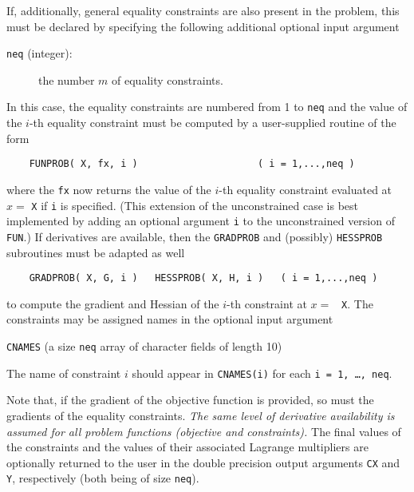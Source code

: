 \documentclass{article}
\begin{document}
If, additionally, general equality constraints are also present in the
problem, this must be declared by specifying the following
additional optional input argument
\begin{description}
\item[{\tt neq} (integer):] the number $m$ of equality constraints.
\end{description}
In this case, the equality constraints are numbered from 1 to {\tt neq}
and the value of the $i$-th equality constraint must be computed by a
user-supplied routine of the form
\begin{lstlisting}
    FUNPROB( X, fx, i )                     ( i = 1,...,neq )
\end{lstlisting}
\noindent
where the {\tt fx} now returns the value of the $i$-th equality constraint
evaluated at $x =$ {\tt X} if {\tt i} is specified. (This extension of the
unconstrained case is best implemented by adding an optional argument
{\tt i} to the unconstrained version of {\tt FUN}.) If derivatives are
available, then the {\tt GRADPROB} and (possibly) {\tt  HESSPROB} subroutines
must be adapted as well
\begin{lstlisting}
    GRADPROB( X, G, i )   HESSPROB( X, H, i )   ( i = 1,...,neq )
\end{lstlisting}
\noindent
to compute the gradient and Hessian of the $i$-th constraint at $x=$ {\tt
X}. The constraints may be assigned names in the optional input argument
\begin{description}
\item[{\tt CNAMES} (a size {\tt neq} array of character fields of
length 10)]\mbox{}
\end{description}
The name of constraint $i$ should appear in {\tt CNAMES(i)}
for each {\tt i = 1, \ldots, neq}.

Note that, if the gradient of the objective
function is provided, so must the gradients of the equality
constraints. \emph{The same level of derivative availability is assumed for all
problem functions (objective and constraints).}  The final values of the
constraints and the values of their associated Lagrange multipliers are
optionally returned to the user in the double precision output
arguments {\tt CX} and {\tt Y}, respectively (both being of size {\tt neq}).
\end{document}
